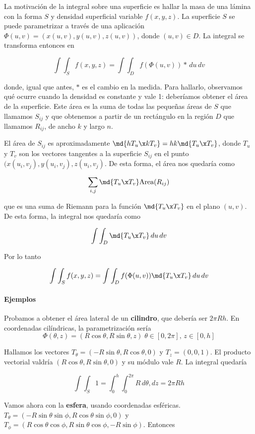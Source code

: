 \documentclass[12pt,a4paper,titlepage]{apuntes}
\begin{document}
La motivación de la integral sobre una superficie es hallar la masa de una lámina con la forma $S$ y densidad superficial variable $f(x,y,z)$. La superficie $S$ se puede parametrizar a través de una aplicación $\Phi(u,v) = (x(u,v), y(u,v), z(u,v))$, donde $(u,v) \in D$. La integral se transforma entonces en

\[ \int\int_Sf(x,y,z) = \int\int_D f(\Phi(u,v))\ast \,du\,dv \]

donde, igual que antes, $\ast$ es el cambio en la medida. Para hallarlo, observamos qué ocurre cuando la densidad es constante y vale 1: deberíamos obtener el área de la superficie. Este área es la suma de todas las pequeñas áreas de $S$ que llamamos $S_{ij}$ y que obtenemos a partir de un rectángulo en la región $D$ que llamamos $R_{ij}$, de ancho $k$ y largo $n$.

El área de $S_{ij}$ es aproximadamente $\md{hT_u\x k T_v} = hk\md{T_u\x T_v}$, donde $T_u$ y $T_v$ son los vectores tangentes a la superficie $S_{ij}$ en el punto $(x(u_i, v_j), y(u_i, v_j), z(u_i, v_j)$. De esta forma, el área nos quedaría como

\[ \sum_{i,j}\md{T_u\x T_v} \text{Area}(R_{ij}) \]

que es una suma de Riemann para la función $\md{T_u\x T_v}$ en el plano $(u,v)$. De esta forma, la integral nos quedaría como 

\[ \int\int_D \md{T_u\x T_v}\,du\,dv \]

Por lo tanto

\[ \int\int_Sf(x,y,z) = \int\int_D f(\Phi(u,v))\md{T_u\x T_v} \,du\,dv \]

\paragraph{Ejemplos}

Probamos a obtener el área lateral de un \textbf{cilindro}, que debería ser $2\pi Rh$. En coordenadas cilíndricas, la parametrización sería \[\Phi(\theta, z) =(R\cos\theta, R\sin\theta, z)\;\theta\in [0,2\pi],\,z\in [0, h]\]

Hallamos los vectores $T_\theta =(-R\sin\theta, R\cos\theta, 0)$ y $T_z=(0,0,1)$. El producto vectorial valdría $(R\cos\theta, R\sin\theta,0)$ y su módulo vale $R$. La integral quedaría

\[ \int\int_S 1 = \int_0^h\int_0^{2\pi}R\,d\theta, dz = 2\pi Rh \]

Vamos ahora con la \textbf{esfera}, usando coordenadas esféricas. $T_\theta = (-R\sin\theta\sin\phi, R\cos\theta\sin\phi,0)$ y $T_\phi = ( R\cos\theta\cos\phi, R\sin\theta\cos\phi, -R\sin\phi)$. Entonces
\end{document}

